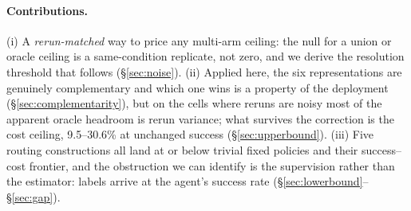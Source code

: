 \paragraph{Contributions.} (i) A \emph{rerun-matched} way to price any multi-arm ceiling: the null for a union or oracle ceiling is a same-condition replicate, not zero, and we derive the resolution threshold that follows (\S\ref{sec:noise}). (ii) Applied here, the six representations are genuinely complementary and which one wins is a property of the deployment (\S\ref{sec:complementarity}), but on the cells where reruns are noisy most of the apparent oracle headroom is rerun variance; what survives the correction is the cost ceiling, 9.5--30.6\% at unchanged success (\S\ref{sec:upperbound}). (iii) Five routing constructions all land at or below trivial fixed policies and their success--cost frontier, and the obstruction we can identify is the supervision rather than the estimator: labels arrive at the agent's success rate (\S\ref{sec:lowerbound}--\S\ref{sec:gap}).
